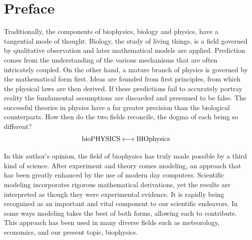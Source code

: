 \chapter*{Preface}

Traditionally, the components of biophysics, biology and physics, have a tangential mode of thought.  Biology, the study of living things, is a field governed by qualitative observation and later mathematical models are applied. Prediction comes from the understanding of the various mechanisms that are often intricately coupled. On the other hand, a mature branch of physics is governed by the mathematical form first. Ideas are founded from first principles, from which the physical laws are then derived. If these predictions fail to accurately portray reality the fundamental assumptions are discarded and presumed to be false. The successful theories in physics have a far greater precision than the biological counterparts. How then do the two fields reconcile, the dogma of each being so different?
%
\begin{equation*}
  \mathrm{bioPHYSICS \longleftrightarrow BIOphysics}
\end{equation*}

In this author’s opinion, the field of biophysics has truly made possible by a third kind of science. After experiment and theory comes modeling, an approach that has been greatly enhanced by the use of modern day computers. Scientific modeling incorporates rigorous mathematical derivations, yet the results are interpreted as though they were experimental evidence. It is rapidly being recognized as an important and vital component to our scientific endeavors.\cite{reed_computational_2005} In some ways modeling takes the best of both forms, allowing each to contribute. This approach has been used in many diverse fields such as meteorology, economics, and our present topic, biophysics.

